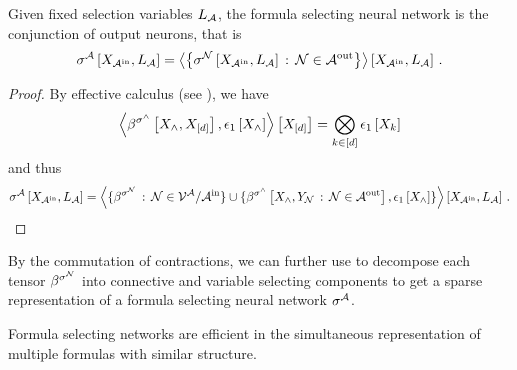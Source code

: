 \begin{theorem}
    Given fixed selection variables $L_{\mathcal{A}}$, the formula selecting neural network is the conjunction of output neurons, that is
    \begin{align*}
        \fsnnat{\catvariableof{\inneuronset},\selvariableof{\larchitecture}} %
        = \contractionof{\left\{\lneuractivationat{\catvariableof{\inneuronset},\selvariableof{\larchitecture}} \wcols \lneuron\in\outneuronset\right\}}{\catvariableof{\inneuronset},\selvariableof{\larchitecture}} \, .
    \end{align*}
\end{theorem}
\begin{proof}
    By effective calculus (see ), we have
    \[ \left\langle \beta^{\sigma^{\land}}\left[X_{\land},X_{[d]}\right],\epsilon_{1}\left[X_{\land}\right]\right\rangle \left[ X_{[d]} \right] = \bigotimes_{k\in[d]} \epsilon_{1}\left[X_{k}\right] \]
    and thus
    \begin{align*}
        \sigma^{\mathcal{A}}\left[X_{\mathcal{A}^{\mathrm{in}}},L_{\mathcal{A}}\right]
        = \left\langle 
            \{\beta^{\sigma^{\mathcal{N}}} \,:\, \mathcal{N}\in\mathcal{V}^{\mathcal{A}}/\mathcal{A}^{\mathrm{in}} \} \cup \{\beta^{\sigma^{\land}}\left[X_{\land},Y_{\mathcal{N}}  \,:\, \mathcal{N}\in\mathcal{A}^{\mathrm{out}}\right], \epsilon_{1}\left[X_{\land}\right]\}
        \right\rangle \left[ X_{\mathcal{A}^{\mathrm{in}}},L_{\mathcal{A}} \right] \, .
    \end{align*}
\end{proof}


By the commutation of contractions, we can further use  to decompose each tensor $\beta^{\sigma^{\mathcal{N}}}$ into connective and variable selecting components to get a sparse representation of a formula selecting neural network $\sigma^{\mathcal{A}}$.



Formula selecting networks are efficient in the simultaneous representation of multiple formulas with similar structure.



